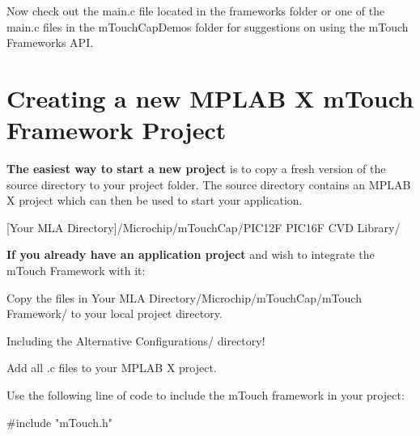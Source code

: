 Now check out the main.\+c file located in the framework\textquotesingle{}s folder or one of the main.\+c files in the m\+Touch\+Cap\+Demos folder for suggestions on using the m\+Touch Framework\textquotesingle{}s A\+P\+I. \hypertarget{GettingStartedNewPX}{}\section{Creating a new M\+P\+L\+A\+B X m\+Touch Framework Project}\label{GettingStartedNewPX}
{\bfseries The easiest way to start a new project} is to copy a fresh version of the source directory to your project folder. The source directory contains an M\+P\+L\+A\+B X project which can then be used to start your application. \begin{DoxyItemize}
\item {\ttfamily \mbox{[}Your M\+L\+A Directory\mbox{]}/\+Microchip/m\+Touch\+Cap/\+P\+I\+C12\+F P\+I\+C16\+F C\+V\+D Library/}\end{DoxyItemize}
{\bfseries If you already have an application project} and wish to integrate the m\+Touch Framework with it\+: 
\begin{DoxyEnumerate}
\item Copy the files in {\ttfamily Your M\+L\+A Directory/\+Microchip/m\+Touch\+Cap/m\+Touch Framework/} to your local project directory. 
\begin{DoxyItemize}
\item Including the {\ttfamily Alternative Configurations/} directory! 
\end{DoxyItemize}


\item Add all {\ttfamily .c} files to your M\+P\+L\+A\+B X project.


\item Use the following line of code to include the m\+Touch framework in your project\+:~\newline
 
\begin{DoxyCode}
\textcolor{preprocessor}{#include "mTouch.h"}
\end{DoxyCode}
 
\end{DoxyEnumerate}


